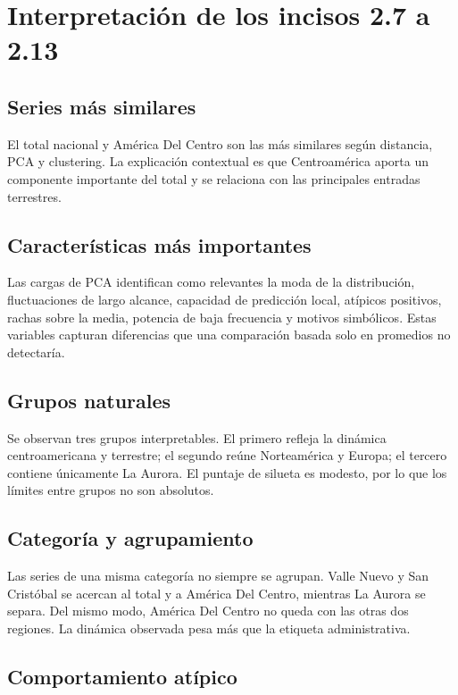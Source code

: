 \documentclass[11pt,letterpaper]{article}
\begin{document}
\vspace{8cm}

\section{Interpretación de los incisos 2.7 a 2.13}

\subsection{Series más similares}

El total nacional y América Del Centro son las más similares según distancia,
PCA y clustering. La explicación contextual es que Centroamérica aporta un
componente importante del total y se relaciona con las principales entradas
terrestres.

\subsection{Características más importantes}

Las cargas de PCA identifican como relevantes la moda de la distribución,
fluctuaciones de largo alcance, capacidad de predicción local, atípicos
positivos, rachas sobre la media, potencia de baja frecuencia y motivos
simbólicos. Estas variables capturan diferencias que una comparación basada
solo en promedios no detectaría.

\subsection{Grupos naturales}

Se observan tres grupos interpretables. El primero refleja la dinámica
centroamericana y terrestre; el segundo reúne Norteamérica y Europa; el
tercero contiene únicamente La Aurora. El puntaje de silueta es modesto, por
lo que los límites entre grupos no son absolutos.

\subsection{Categoría y agrupamiento}

Las series de una misma categoría no siempre se agrupan. Valle Nuevo y San
Cristóbal se acercan al total y a América Del Centro, mientras La Aurora se
separa. Del mismo modo, América Del Centro no queda con las otras dos
regiones. La dinámica observada pesa más que la etiqueta administrativa.

\subsection{Comportamiento atípico}
\end{document}
